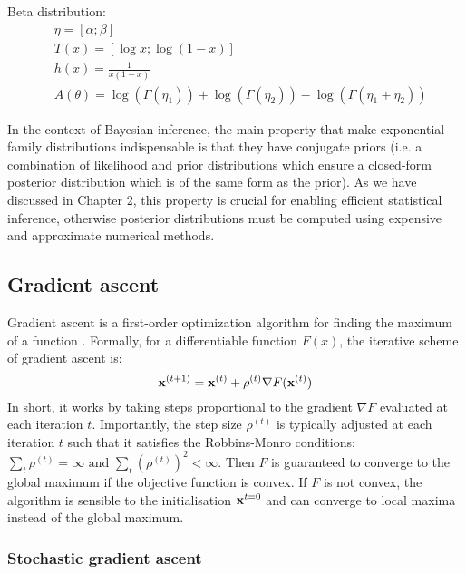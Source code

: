 Beta distribution:
\begin{align*}
	& \eta = [\alpha; \beta] \\
	& T(x) = [\log x; \log (1-x)] \\
	& h(x) = \frac{1}{x(1-x)} \\
	& A(\theta) = \log(\Gamma(\eta_1)) +\log(\Gamma(\eta_2)) - \log(\Gamma(\eta_1+\eta_2))
\end{align*}

In the context of Bayesian inference, the main property that make exponential family distributions indispensable is that they have conjugate priors (i.e. a combination of likelihood and prior distributions which ensure a closed-form posterior distribution which is of the same form as the prior). As we have discussed in Chapter 2, this property is crucial for enabling efficient statistical inference, otherwise posterior distributions must be computed using expensive and approximate numerical methods.


\subsection{Gradient ascent} \label{section:gradient_ascent}

Gradient ascent is a first-order optimization algorithm for finding the maximum of a function \cite{Bishop2006,Murphy}. Formally, for a differentiable function $F(x)$, the iterative scheme of gradient ascent is:
\begin{equation} \label{gradient_ascent}
	{\bf x}^{(t+1)} = {\bf x}^{(t)} + \rho^{(t)} \nabla F({\bf x}^{(t)})
\end{equation}
In short, it works by taking steps proportional to the gradient $\nabla F$ evaluated at each iteration $t$. 
Importantly, the step size $\rho^{(t)}$ is typically adjusted at each iteration $t$ such that it satisfies the Robbins-Monro conditions: $\sum_t \rho^{(t)} = \infty \text{ and } \sum_t (\rho^{(t)})^2 < \infty$. Then $F$ is guaranteed to converge to the global maximum \cite{Robbins-Monro1951} if the objective function is convex. If $F$ is not convex, the algorithm is sensible to the initialisation ${\bf x}^{t=0}$ and can converge to local maxima instead of the global maximum.


\subsubsection{Stochastic gradient ascent} \label{section:stochastic_gradient_ascent}

